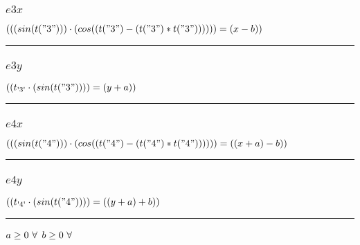 \documentclass[11pt]{article}
\begin{document}
\subsubsection*{$e3x$}
$
((( sin(t("3")) ) \cdot ( cos((t("3") - (t("3") * t("3")))) )) = (x - b))
$
\vspace{5pt}
\hrule
\subsubsection*{$e3y$}
$
((t_\text{\text{\textquotesingle 3\textquotesingle}} \cdot ( sin(t("3")) )) = (y + a))
$
\vspace{5pt}
\hrule
\subsubsection*{$e4x$}
$
((( sin(t("4")) ) \cdot ( cos((t("4") - (t("4") * t("4")))) )) = ((x + a) - b))
$
\vspace{5pt}
\hrule
\subsubsection*{$e4y$}
$
((t_\text{\text{\textquotesingle 4\textquotesingle}} \cdot ( sin(t("4")) )) = ((y + a) + b))
$
\vspace{5pt}
\hrule
\bigskip
$a\geq 0 ~ \forall \\$
$b\geq 0 ~ \forall \\$
\end{document}
